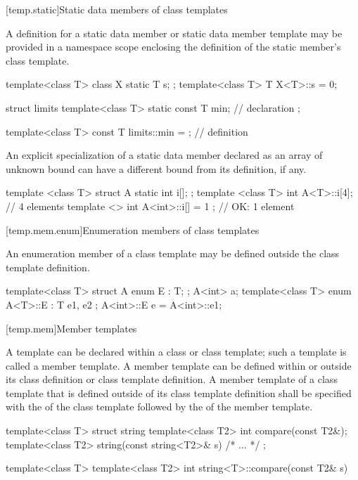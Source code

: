 [temp.static]{Static data members of class templates}

\pnum
{}%
A definition for a static data member or static data member template may be
provided in a namespace scope enclosing the definition of the static member's
class template.
\enterexample

\begin{codeblock}
template<class T> class X {
  static T s;
};
template<class T> T X<T>::s = 0;

struct limits {
  template<class T>
    static const T min;           // declaration
};

template<class T>
  const T limits::min = { };      // definition
\end{codeblock}
\exitexample

\pnum
An explicit specialization of a static data member declared as an array of unknown
bound can have a different bound from its definition, if any. \enterexample

\begin{codeblock}
template <class T> struct A {
  static int i[];
};
template <class T> int A<T>::i[4];    // 4 elements
template <> int A<int>::i[] = { 1 };  // OK: 1 element
\end{codeblock}
\exitexample

[temp.mem.enum]{Enumeration members of class templates}

\pnum
An enumeration member of a class template may be defined outside the class
template definition. \enterexample

\begin{codeblock}
template<class T> struct A {
  enum E : T;
};
A<int> a;
template<class T> enum A<T>::E : T { e1, e2 };
A<int>::E e = A<int>::e1;
\end{codeblock}
\exitexample

[temp.mem]{Member templates}

\pnum
A template can be declared within a class or class template; such a template
is called a member template.
A member template can be defined within or outside its class definition or
class template definition.
A member template of a class template that is defined outside of its class
template definition shall be specified with the
of the class template followed by the
of the member template.
\enterexample

\begin{codeblock}
template<class T> struct string {
  template<class T2> int compare(const T2&);
  template<class T2> string(const string<T2>& s) { /* ... */ }
};

template<class T> template<class T2> int string<T>::compare(const T2& s) {
}
\end{codeblock}
\exitexample

